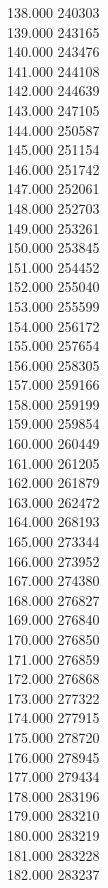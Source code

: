 { 138.000	240303 \\
 139.000	243165 \\
 140.000	243476 \\
 141.000	244108 \\
 142.000	244639 \\
 143.000	247105 \\
 144.000	250587 \\
 145.000	251154 \\
 146.000	251742 \\
 147.000	252061 \\
 148.000	252703 \\
 149.000	253261 \\
 150.000	253845 \\
 151.000	254452 \\
 152.000	255040 \\
 153.000	255599 \\
 154.000	256172 \\
 155.000	257654 \\
 156.000	258305 \\
 157.000	259166 \\
 158.000	259199 \\
 159.000	259854 \\
 160.000	260449 \\
 161.000	261205 \\
 162.000	261879 \\
 163.000	262472 \\
 164.000	268193 \\
 165.000	273344 \\
 166.000	273952 \\
 167.000	274380 \\
 168.000	276827 \\
 169.000	276840 \\
 170.000	276850 \\
 171.000	276859 \\
 172.000	276868 \\
 173.000	277322 \\
 174.000	277915 \\
 175.000	278720 \\
 176.000	278945 \\
 177.000	279434 \\
 178.000	283196 \\
 179.000	283210 \\
 180.000	283219 \\
 181.000	283228 \\
 182.000	283237 \\
}

